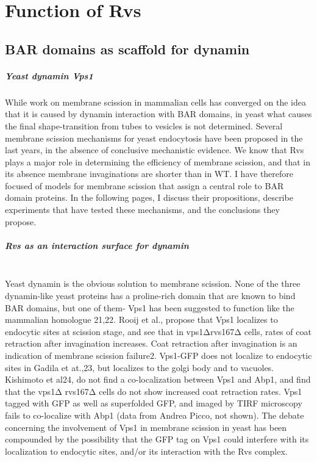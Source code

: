 		
\section{Function of Rvs}

	\subsection{BAR domains as scaffold for dynamin}
	\subparagraph{Yeast dynamin Vps1}
	
While work on membrane scission in mammalian cells has converged on the idea that it is caused by dynamin interaction with BAR domains, in yeast what causes the final shape-transition from tubes to vesicles is not determined. Several membrane scission mechanisms for yeast endocytosis have been proposed in the last years, in the absence of conclusive mechanistic evidence. We know that Rvs plays a major role in determining the efficiency of membrane scission, and that in its absence membrane invaginations are shorter than in WT. I have therefore focused of models for membrane scission that assign a central role to BAR domain proteins. In the following pages, I discuss their propositions, describe experiments that have tested these mechanisms, and the conclusions they propose. 

	
		\subparagraph{Rvs as an interaction surface for dynamin }
	\mbox{}\\
Yeast dynamin is the obvious solution to membrane scission. None of the three dynamin-like yeast proteins has a proline-rich domain that are known to bind BAR domains, but one of them- Vps1 has been suggested to function like the mammalian homologue 21,22. Rooij et al., propose that Vps1 localizes to endocytic sites at scission stage, and see that in vps1Δrvs167Δ cells, rates of coat retraction after invagination increases. Coat retraction after invagination is an indication of membrane scission failure2. Vps1-GFP does not localize to endocytic sites in Gadila et at.,23, but localizes to the golgi body and to vacuoles. Kishimoto et al24, do not find a co-localization between Vps1 and Abp1, and find that the vps1Δ rvs167Δ  cells do not show increased coat retraction rates. Vps1 tagged with GFP as well as superfolded GFP, and imaged by TIRF microscopy fails to co-localize with Abp1 (data from Andrea Picco, not shown). The debate concerning the involvement of Vps1 in membrane scission in yeast has been compounded by the possibility that the GFP tag on Vps1 could interfere with its localization to endocytic sites, and/or its interaction with the Rvs complex. 

